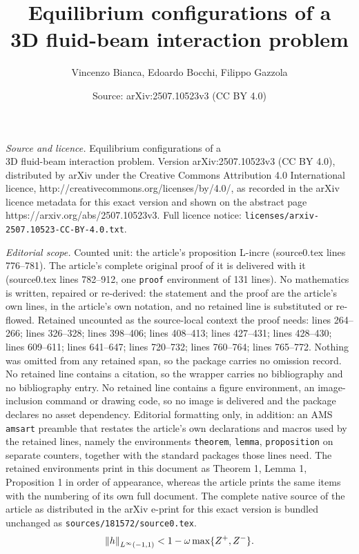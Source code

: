 \documentclass[10pt,a4paper]{amsart}
\title{Equilibrium configurations of a\\ 3D fluid-beam interaction problem}
\author{Vincenzo Bianca, Edoardo Bocchi, Filippo Gazzola}
\date{Source: arXiv:2507.10523v3 (CC BY 4.0)}
\begin{document}
\maketitle

\noindent\emph{Source and licence.} Equilibrium configurations of a\\ 3D fluid-beam interaction problem. Version arXiv:2507.10523v3 (CC BY 4.0), distributed by arXiv under the Creative Commons Attribution 4.0 International licence, http://creativecommons.org/licenses/by/4.0/, as recorded in the arXiv licence metadata for this exact version and shown on the abstract page https://arxiv.org/abs/2507.10523v3. Full licence notice: \texttt{licenses/arxiv-2507.10523-CC-BY-4.0.txt}.\par\smallskip

\noindent\textit{Editorial scope.} Counted unit: the article's proposition L-incre (source0.tex lines 776--781). The article's complete original proof of it is delivered with it (source0.tex lines 782--912, one \texttt{proof} environment of 131 lines). No mathematics is written, repaired or re-derived: the statement and the proof are the article's own lines, in the article's own notation, and no retained line is substituted or re-flowed.  Retained uncounted as the source-local context the proof needs: lines 264--266; lines 326--328; lines 398--406; lines 408--413; lines 427--431; lines 428--430; lines 609--611; lines 641--647; lines 720--732; lines 760--764; lines 765--772.  Nothing was omitted from any retained span, so the package carries no omission record.  No retained line contains a citation, so the wrapper carries no bibliography and no bibliography entry.  No retained line contains a figure environment, an image-inclusion command or drawing code, so no image is delivered and the package declares no asset dependency.  Editorial formatting only, in addition: an AMS \texttt{amsart} preamble that restates the article's own declarations and macros used by the retained lines, namely the environments \texttt{theorem}, \texttt{lemma}, \texttt{proposition} on separate counters, together with the standard packages those lines need.  The retained environments print in this document as Theorem 1, Lemma 1, Proposition 1 in order of appearance, whereas the article prints the same items with the numbering of its own full document.  The complete native source of the article as distributed in the arXiv e-print for this exact version is bundled unchanged as \texttt{sources/181572/source0.tex}.
\begin{equation}\label{eq_bound_infty}
\left\|h\right\|_{L^\infty(-1,1)} <	1- \omega\max\{Z^+,Z^- \}.\\[5pt]
\end{equation}
\end{document}
